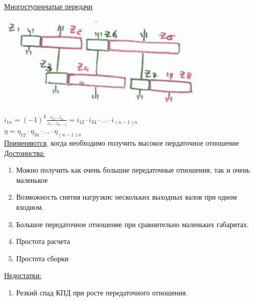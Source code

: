 \documentclass{article}
\begin{document}
\underline{Многоступенчатые передачи} 

\includegraphics[width = 0.75\textwidth]{2}

$i_{1n} = (-1)^k \frac{z_2 \dots z_n}{z_1 \dots z_{n-1}} = i_{12} \cdot i_{34} \cdot \dots \cdot i_{(n-1)n}$\\
$\eta = \eta_{12} \cdot \eta_{34} \cdot \dots \cdot \eta_{(n-1)n}$\\
\underline{Применяются}, когда необходимо получить высокое пердаточное отношение
\underline{Достоинства:}
\begin{enumerate}
	\item Можно получить как очень большие передаточные отношения, так и очень маленькое
	\item Возможность снятия нагрузкис нескольких выходных валов при одном входном.
	\item Большое передаточное отношение при сравнительно маленьких габаритах.
	\item Простота расчета
	\item Простота сборки
\end{enumerate}
\underline{Недостатки:} 
\begin{enumerate}
	\item Резкий спад КПД при росте передаточного отношения.
\end{enumerate}
\end{document}

